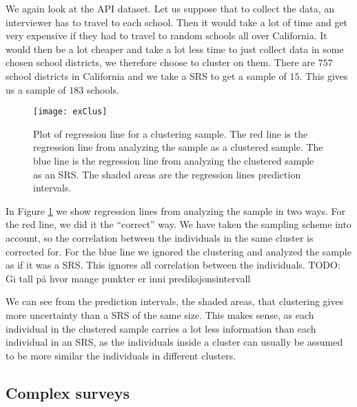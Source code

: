\documentclass{article}
\begin{document}
\begin{example}
  We again look at the API dataset. Let us suppose that to collect the data, an
  interviewer has to travel to each school. Then it would take a lot of time and
  get very expensive if they had to travel to random schools all over
  California. It would then be a lot cheaper and take a lot less time to just
  collect data in some chosen school districts, we therefore choose to cluster
  on them. There are \(757\) school districts in California and we take a SRS to
  get a sample of \(15\). This gives us a sample of \(183\) schools.

  \begin{figure}
    \centering
    \texttt{[image: exClus]}

    \caption{Plot of regression line for a clustering sample. The red line is
      the regression line from analyzing the sample as a clustered sample. The
      blue line is the regression line from analyzing the clustered sample as an
    SRS. The shaded areas are the regression lines prediction intervals.}

    \label{fig:exClus}
  \end{figure}

  In Figure \ref{fig:exClus} we show regression lines from analyzing the sample
  in two ways. For the red line, we did it the ``correct'' way. We have taken
  the sampling scheme into account, so the correlation between the individuals
  in the same cluster is corrected for. For the blue line we ignored the
  clustering and analyzed the sample as if it was a SRS. This ignores all
  correlation between the individuals.
  TODO: Gi tall på hvor mange punkter er inni prediksjonsintervall

  We can see from the prediction intervals, the shaded areas, that clustering
  gives more uncertainty than a SRS of the same size. This makes sense, as each
  individual in the clustered sample carries a lot less information than each
  individual in an SRS, as the individuals inside a cluster can usually be
  assumed to be more similar the individuals in different clusters.

\end{example}

\subsection{Complex surveys}
\end{document}
